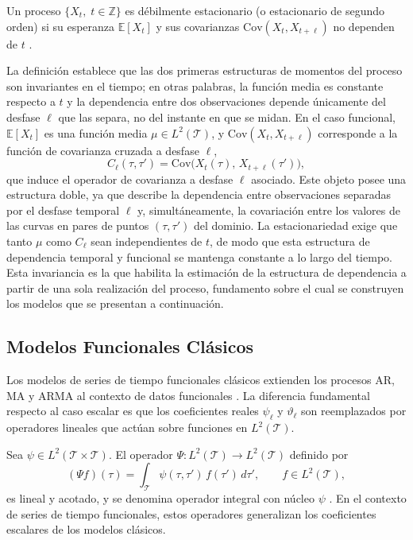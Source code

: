 \begin{definition}
Un proceso $\{X_t,\; t \in \mathbb{Z}\}$ es débilmente estacionario (o estacionario de segundo orden) si su esperanza $\mathbb{E}[X_t]$ y sus covarianzas $\mathrm{Cov}(X_t, X_{t+\ell})$ no dependen de $t$ \citep{02_02_bosq2000linear}.
\end{definition}
La definición establece que las dos primeras estructuras de momentos del proceso son invariantes en el tiempo; en otras palabras, la función media es constante respecto a $t$ y la dependencia entre dos observaciones depende únicamente del desfase $\ell$ que las separa, no del instante en que se midan. En el caso funcional, $\mathbb{E}[X_t]$ es una función media $\mu \in L^2(\mathcal{T})$, y $\mathrm{Cov}(X_t, X_{t+\ell})$ corresponde a la función de covarianza cruzada a desfase $\ell$,
\begin{equation}
    C_\ell(\tau, \tau') = \mathrm{Cov}\bigl(X_t(\tau),\, X_{t+\ell}(\tau')\bigr),
\end{equation}
que induce el operador de covarianza a desfase $\ell$ asociado. Este objeto posee una estructura doble, ya que describe la dependencia entre observaciones separadas por el desfase temporal $\ell$ y, simultáneamente, la covariación entre los valores de las curvas en pares de puntos $(\tau, \tau')$ del dominio. La estacionariedad exige que tanto $\mu$ como $C_\ell$ sean independientes de $t$, de modo que esta estructura de dependencia temporal y funcional se mantenga constante a lo largo del tiempo.\\

Esta invariancia es la que habilita la estimación de la estructura de dependencia a partir de una sola realización del proceso, fundamento sobre el cual se construyen los modelos que se presentan a continuación.

\subsection{Modelos Funcionales Clásicos}
\label{02_02_02_modelos_funcionales_clasicos}
Los modelos de series de tiempo funcionales clásicos extienden los procesos AR, MA y ARMA al contexto de datos funcionales \citep{02_02_bosq2000linear}. La diferencia fundamental respecto al caso escalar es que los coeficientes reales $\psi_\ell$ y $\vartheta_\ell$ son reemplazados por operadores lineales que actúan sobre funciones en $L^2(\mathcal{T})$.

\begin{definition}
Sea $\psi \in L^2(\mathcal{T} \times \mathcal{T})$. El operador $\Psi: L^2(\mathcal{T}) \to L^2(\mathcal{T})$ definido por
\begin{equation}
    (\Psi f)(\tau) = \int_{\mathcal{T}} \psi(\tau, \tau')\, f(\tau')\, d\tau',
    \qquad f \in L^2(\mathcal{T}),
\end{equation}
es lineal y acotado, y se denomina operador integral con núcleo $\psi$ \citep{02_02_bosq2000linear, 02_02_hsing2015theoretical}. En el contexto de series de tiempo funcionales, estos operadores generalizan los coeficientes escalares de los modelos clásicos.
\end{definition}

